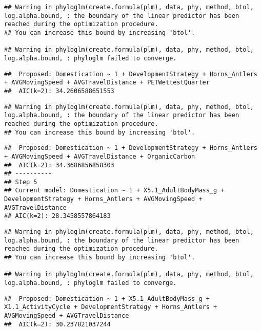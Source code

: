\documentclass[
]{article}
\begin{document}
\begin{verbatim}
## Warning in phyloglm(create.formula(plm), data, phy, method, btol, log.alpha.bound, : the boundary of the linear predictor has been reached during the optimization procedure.
## You can increase this bound by increasing 'btol'.

## Warning in phyloglm(create.formula(plm), data, phy, method, btol, log.alpha.bound, : phyloglm failed to converge.
\end{verbatim}

\begin{verbatim}
##  Proposed: Domestication ~ 1 + DevelopmentStrategy + Horns_Antlers + AVGMovingSpeed + AVGTravelDistance + PETWettestQuarter
##  AIC(k=2): 34.2606588651553
\end{verbatim}

\begin{verbatim}
## Warning in phyloglm(create.formula(plm), data, phy, method, btol, log.alpha.bound, : the boundary of the linear predictor has been reached during the optimization procedure.
## You can increase this bound by increasing 'btol'.
\end{verbatim}

\begin{verbatim}
##  Proposed: Domestication ~ 1 + DevelopmentStrategy + Horns_Antlers + AVGMovingSpeed + AVGTravelDistance + OrganicCarbon
##  AIC(k=2): 34.3686856858303
## ----------
## Step 5
## Current model: Domestication ~ 1 + X5.1_AdultBodyMass_g + DevelopmentStrategy + Horns_Antlers + AVGMovingSpeed + AVGTravelDistance
## AIC(k=2): 28.3458557864183
\end{verbatim}

\begin{verbatim}
## Warning in phyloglm(create.formula(plm), data, phy, method, btol, log.alpha.bound, : the boundary of the linear predictor has been reached during the optimization procedure.
## You can increase this bound by increasing 'btol'.

## Warning in phyloglm(create.formula(plm), data, phy, method, btol, log.alpha.bound, : phyloglm failed to converge.
\end{verbatim}

\begin{verbatim}
##  Proposed: Domestication ~ 1 + X5.1_AdultBodyMass_g + X1.1_ActivityCycle + DevelopmentStrategy + Horns_Antlers + AVGMovingSpeed + AVGTravelDistance
##  AIC(k=2): 30.237821037244
\end{verbatim}
\end{document}
